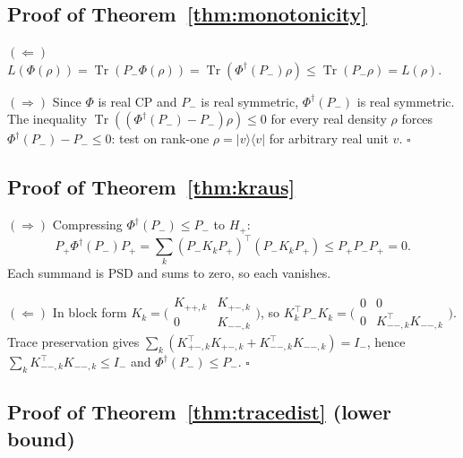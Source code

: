 \documentclass[a4paper,onecolumn,noarxiv]{quantumarticle}
\theoremstyle{plain}
\theoremstyle{definition}
\theoremstyle{remark}
\newcommand{\Pplus}{P_{+}}
\newcommand{\Pminus}{P_{-}}
\newcommand{\Hplus}{H_{+}}
\newcommand{\Tr}{\operatorname{Tr}}
\newcommand{\Phid}{\Phi^{\dagger}}
\newcommand{\Lleak}{L}
\begin{document}
\subsection*{Proof of Theorem~\ref{thm:monotonicity}}

$(\Leftarrow)$\; $\Lleak(\Phi(\rho))=\Tr(\Pminus\Phi(\rho))=\Tr(\Phid(\Pminus)\rho)
\le\Tr(\Pminus\rho)=\Lleak(\rho)$.

$(\Rightarrow)$\; Since $\Phi$ is real CP and $\Pminus$ is real symmetric, $\Phid(\Pminus)$
is real symmetric. The inequality $\Tr((\Phid(\Pminus)-\Pminus)\rho)\le 0$ for every
real density $\rho$ forces $\Phid(\Pminus)-\Pminus\le 0$: test on rank-one
$\rho=|v\rangle\langle v|$ for arbitrary real unit $v$. \hfill$\square$

\subsection*{Proof of Theorem~\ref{thm:kraus}}

$(\Rightarrow)$\; Compressing $\Phid(\Pminus)\le\Pminus$ to $\Hplus$:
\[
  \Pplus\Phid(\Pminus)\Pplus
  = \sum_k(\Pminus K_k\Pplus)^\top(\Pminus K_k\Pplus) \le \Pplus\Pminus\Pplus = 0.
\]
Each summand is PSD and sums to zero, so each vanishes.

$(\Leftarrow)$\; In block form $K_k=\bigl(\begin{smallmatrix}K_{++,k}&K_{+-,k}\\0&K_{--,k}\end{smallmatrix}\bigr)$,
so $K_k^\top\Pminus K_k=\bigl(\begin{smallmatrix}0&0\\0&K_{--,k}^\top K_{--,k}\end{smallmatrix}\bigr)$.
Trace preservation gives $\sum_k(K_{+-,k}^\top K_{+-,k}+K_{--,k}^\top K_{--,k})=I_-$,
hence $\sum_k K_{--,k}^\top K_{--,k}\le I_-$ and $\Phid(\Pminus)\le\Pminus$.
\hfill$\square$

\subsection*{Proof of Theorem~\ref{thm:tracedist} (lower bound)}
\end{document}
